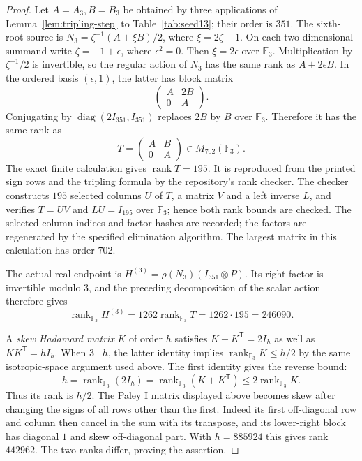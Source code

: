 \documentclass[10pt]{article}
\newcommand{\F}{\mathbb F}
\begin{document}
\begin{proof}
Let $A=A_3,B=B_3$ be obtained by three applications of
Lemma~\ref{lem:tripling-step} to Table~\ref{tab:seed13}; their order
is $351$. The sixth-root source is
$N_3=\zeta^{-1}(A+\xi B)/2$, where $\xi=2\zeta-1$.
On each two-dimensional summand write $\zeta=-1+\epsilon$, where
$\epsilon^2=0$. Then $\xi=2\epsilon$ over $\F_3$.
Multiplication by $\zeta^{-1}/2$ is invertible, so the regular action
of $N_3$ has the same rank as $A+2\epsilon B$. In the ordered basis
$(\epsilon,1)$, the latter has block matrix
\[
 \begin{pmatrix}A&2B\\0&A\end{pmatrix}.
\]
Conjugating by $\operatorname{diag}(2I_{351},I_{351})$ replaces
$2B$ by $B$ over $\F_3$. Therefore it has the same rank as
\begin{equation}\label{eq:source351-mod3}
 T=\begin{pmatrix}A&B\\0&A\end{pmatrix}\in M_{702}(\F_3).
\end{equation}
The exact finite calculation gives $\operatorname{rank}T=195$.
It is reproduced from the printed sign rows and the tripling formula
by the repository's rank checker. The checker constructs $195$ selected
columns $U$ of $T$, a matrix $V$ and a left inverse $L$, and verifies
$T=UV$ and $LU=I_{195}$ over $\F_3$; hence both rank bounds are
checked. The selected column indices and factor hashes are recorded;
the factors are regenerated by the specified elimination algorithm.
The largest matrix
in this calculation has order $702$.

The actual real endpoint is
$H^{(3)}=\rho(N_3)(I_{351}\otimes P)$. Its right factor is invertible
modulo $3$, and the preceding decomposition of the scalar action
therefore gives
\[
 \operatorname{rank}_{\F_3}H^{(3)}=1262\operatorname{rank}_{\F_3}T
 =1262\cdot195=246090.
\]

A \emph{skew Hadamard matrix} $K$ of order $h$ satisfies
$K+K^{\mathsf T}=2I_h$ as well as $KK^{\mathsf T}=hI_h$.
When $3\mid h$, the latter identity implies
$\operatorname{rank}_{\F_3}K\leq h/2$ by the same isotropic-space
argument used above. The first identity gives the reverse bound:
\[
 h=\operatorname{rank}_{\F_3}(2I_h)
 =\operatorname{rank}_{\F_3}(K+K^{\mathsf T})
 \leq2\operatorname{rank}_{\F_3}K.
\]
Thus its rank is $h/2$. The Paley I matrix displayed above becomes
skew after changing the signs of all rows other than the first.
Indeed its first off-diagonal row and column then cancel in the sum
with its transpose, and its lower-right block has diagonal $1$ and
skew off-diagonal part. With $h=885924$ this gives rank $442962$.
The two ranks differ, proving the assertion.
\end{proof}
\end{document}
